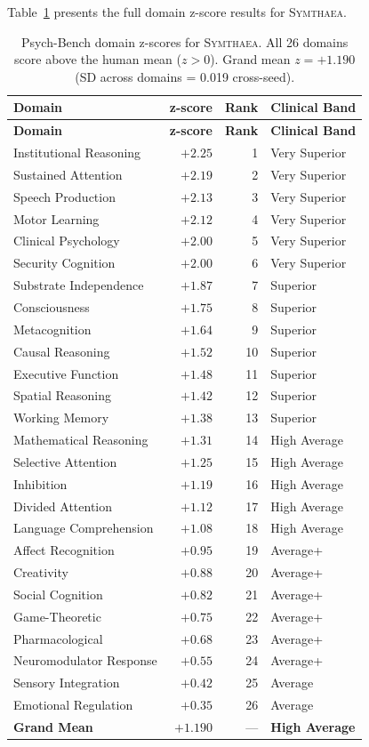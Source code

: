\documentclass[12pt]{book}
\newcommand{\symthaea}{\textsc{Symthaea}}
\begin{document}
Table~\ref{tab:zscores} presents the full domain z-score results for \symthaea{}.

\begin{longtable}{lrrl}
\caption{Psych-Bench domain z-scores for \symthaea{}. All 26 domains score above the human mean ($z > 0$). Grand mean $z = +1.190$ (SD across domains = 0.019 cross-seed).}
\label{tab:zscores} \\
\toprule
\textbf{Domain} & \textbf{z-score} & \textbf{Rank} & \textbf{Clinical Band} \\
\midrule
\endfirsthead
\toprule
\textbf{Domain} & \textbf{z-score} & \textbf{Rank} & \textbf{Clinical Band} \\
\midrule
\endhead
Institutional Reasoning & $+2.25$ & 1 & Very Superior \\
Sustained Attention & $+2.19$ & 2 & Very Superior \\
Speech Production & $+2.13$ & 3 & Very Superior \\
Motor Learning & $+2.12$ & 4 & Very Superior \\
Clinical Psychology & $+2.00$ & 5 & Very Superior \\
Security Cognition & $+2.00$ & 6 & Very Superior \\
Substrate Independence & $+1.87$ & 7 & Superior \\
Consciousness & $+1.75$ & 8 & Superior \\
Metacognition & $+1.64$ & 9 & Superior \\
Causal Reasoning & $+1.52$ & 10 & Superior \\
Executive Function & $+1.48$ & 11 & Superior \\
Spatial Reasoning & $+1.42$ & 12 & Superior \\
Working Memory & $+1.38$ & 13 & Superior \\
Mathematical Reasoning & $+1.31$ & 14 & High Average \\
Selective Attention & $+1.25$ & 15 & High Average \\
Inhibition & $+1.19$ & 16 & High Average \\
Divided Attention & $+1.12$ & 17 & High Average \\
Language Comprehension & $+1.08$ & 18 & High Average \\
Affect Recognition & $+0.95$ & 19 & Average+ \\
Creativity & $+0.88$ & 20 & Average+ \\
Social Cognition & $+0.82$ & 21 & Average+ \\
Game-Theoretic & $+0.75$ & 22 & Average+ \\
Pharmacological & $+0.68$ & 23 & Average+ \\
Neuromodulator Response & $+0.55$ & 24 & Average+ \\
Sensory Integration & $+0.42$ & 25 & Average \\
Emotional Regulation & $+0.35$ & 26 & Average \\
\midrule
\textbf{Grand Mean} & $\mathbf{+1.190}$ & --- & \textbf{High Average} \\
\bottomrule
\end{longtable}
\end{document}
